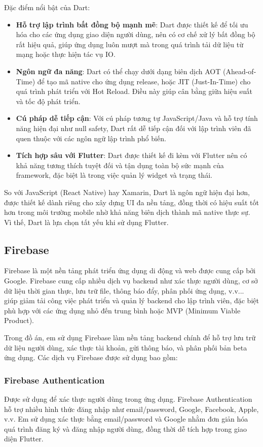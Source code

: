 \documentclass[../DoAn.tex]{subfiles}
\begin{document}
Đặc điểm nổi bật của Dart:
\begin{itemize} 
\item \textbf{Hỗ trợ lập trình bất đồng bộ mạnh mẽ}: Dart được thiết kế để tối ưu hóa cho các ứng dụng giao diện người dùng, nên có cơ chế xử lý bất đồng bộ rất hiệu quả, giúp ứng dụng luôn mượt mà trong quá trình tải dữ liệu từ mạng hoặc thực hiện tác vụ IO.
\item \textbf{Ngôn ngữ đa năng}: Dart có thể chạy dưới dạng biên dịch AOT (Ahead-of-Time) để tạo mã native cho ứng dụng release, hoặc JIT (Just-In-Time) cho quá trình phát triển với Hot Reload. Điều này giúp cân bằng giữa hiệu suất và tốc độ phát triển.
\item \textbf{Cú pháp dễ tiếp cận}: Với cú pháp tương tự JavaScript/Java và hỗ trợ tính năng hiện đại như null safety, Dart rất dễ tiếp cận đối với lập trình viên đã quen thuộc với các ngôn ngữ lập trình phổ biến.
\item \textbf{Tích hợp sâu với Flutter}: Dart được thiết kế đi kèm với Flutter nên có khả năng tương thích tuyệt đối và tận dụng toàn bộ sức mạnh của framework, đặc biệt là trong việc quản lý widget và trạng thái.

\end{itemize}
So với JavaScript (React Native) hay Xamarin, Dart là ngôn ngữ hiện đại hơn, được thiết kế dành riêng cho xây dựng UI đa nền tảng, đồng thời có hiệu suất tốt hơn trong môi trường mobile nhờ khả năng biên dịch thành mã native thực sự. Vì thế, Dart là lựa chọn tất yếu khi sử dụng Flutter.
\subsection{Firebase\cite{Firebase}}
Firebase là một nền tảng phát triển ứng dụng di động và web được cung cấp bởi Google. Firebase cung cấp nhiều dịch vụ backend như xác thực người dùng, cơ sở dữ liệu thời gian thực, lưu trữ file, thông báo đẩy, phân phối ứng dụng, v.v... giúp giảm tải công việc phát triển và quản lý backend cho lập trình viên, đặc biệt phù hợp với các ứng dụng nhỏ đến trung bình hoặc MVP (Minimum Viable Product).

Trong đồ án, em sử dụng Firebase làm nền tảng backend chính để hỗ trợ lưu trữ dữ liệu người dùng, xác thực tài khoản, gửi thông báo, và phân phối bản beta ứng dụng. Các dịch vụ Firebase được sử dụng bao gồm:
\subsubsection{Firebase Authentication}
Được sử dụng để xác thực người dùng trong ứng dụng. Firebase Authentication hỗ trợ nhiều hình thức đăng nhập như email/password, Google, Facebook, Apple, v.v. Em sử dụng xác thực bằng email/password và Google nhằm đơn giản hóa quá trình đăng ký và đăng nhập người dùng, đồng thời dễ tích hợp trong giao diện Flutter.
\end{document}
